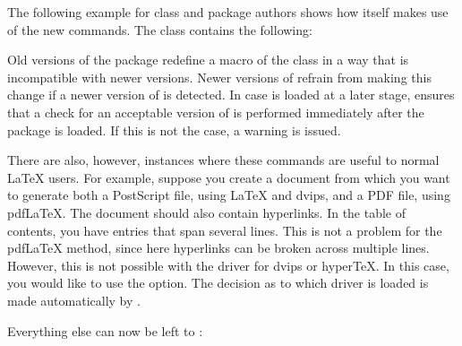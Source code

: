 \begin{Example}
  The following example for class and package authors shows how \KOMAScript{}
  itself makes use of the new commands. The class  contains the
  following:
\begin{lstcode}
\end{lstcode}
  Old versions of the  package redefine a macro of the
   class in a way that is incompatible with newer \KOMAScript{}
  versions. Newer versions of  refrain from making this
  change if a newer version of \KOMAScript{} is detected. In case
   is loaded at a later stage,  ensures that
  a check for an acceptable version of  is performed
  immediately after the package is loaded. If this is not the case, a warning
  is issued.

  There are also, however, instances where these commands are useful to normal
  \LaTeX{} users. For example, suppose you create a document from which you
  want to generate both a PostScript file, using \LaTeX{} and dvips, and a PDF
  file, using \mbox{pdf{\LaTeX}}. The document should also contain hyperlinks.
  In the table of contents, you have entries that span several lines. This is
  not a problem for the \mbox{pdf{\LaTeX}} method, since here hyperlinks can
  be broken across multiple lines.  However, this is not possible with the
   driver for dvips or \mbox{hyper{\TeX}}. In this case, you
  would like  to use the  option. The
  decision as to which driver is loaded is made automatically by
  .

  Everything else can now be left to :
\end{Example}
